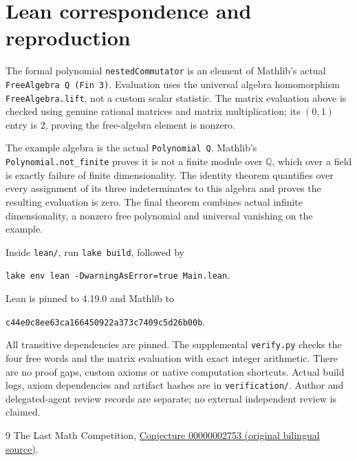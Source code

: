 \documentclass[11pt]{article}
\begin{document}
\section*{Lean correspondence and reproduction}
The formal polynomial \texttt{nestedCommutator} is an element of Mathlib's actual \texttt{FreeAlgebra Q (Fin 3)}. Evaluation uses the universal algebra homomorphism \texttt{FreeAlgebra.lift}, not a custom scalar statistic. The matrix evaluation above is checked using genuine rational matrices and matrix multiplication; its $(0,1)$ entry is $2$, proving the free-algebra element is nonzero.

The example algebra is the actual \texttt{Polynomial Q}. Mathlib's \texttt{Polynomial.not\_finite} proves it is not a finite module over $\mathbb Q$, which over a field is exactly failure of finite dimensionality. The identity theorem quantifies over every assignment of its three indeterminates to this algebra and proves the resulting evaluation is zero. The final theorem combines actual infinite dimensionality, a nonzero free polynomial and universal vanishing on the example.

Inside \texttt{lean/}, run \texttt{lake build}, followed by
\begin{center}\texttt{lake env lean -DwarningAsError=true Main.lean}.\end{center}
Lean is pinned to 4.19.0 and Mathlib to
\begin{center}\small\texttt{c44e0c8ee63ca166450922a373c7409c5d26b00b}.\end{center}
All transitive dependencies are pinned. The supplemental \texttt{verify.py} checks the four free words and the matrix evaluation with exact integer arithmetic. There are no proof gaps, custom axioms or native computation shortcuts. Actual build logs, axiom dependencies and artifact hashes are in \texttt{verification/}. Author and delegated-agent review records are separate; no external independent review is claimed.

\begin{thebibliography}{9}
 The Last Math Competition,
\href{https://github.com/The-Last-Math-Competition/The-Last-Math-Competition/blob/main/conjectures/00000002753.md}{Conjecture 00000002753 (original bilingual source)}.
\end{thebibliography}
\end{document}
